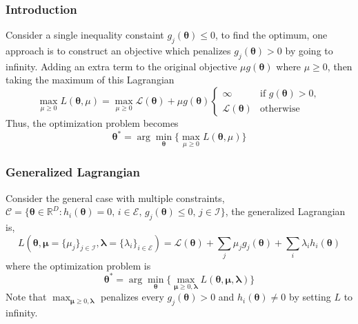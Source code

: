 \documentclass[11pt]{article}
\begin{document}
\subsubsection*{Introduction}
Consider a single inequality constaint $g_j(\boldsymbol{\theta}) \leq 0$, to find the optimum, one approach is to construct an objective which penalizes $g_j(\boldsymbol{\theta}) > 0$ by going to infinity.
Adding an extra term to the original objective $\mu g(\boldsymbol{\theta})$ where $\mu \geq 0$, then taking the maximum of this Lagrangian
\[
\max_{\mu \geq 0} L(\boldsymbol{\theta}, \mu) = \max_{\mu \geq 0} \mathcal{L}(\boldsymbol{\theta}) + \mu g(\boldsymbol{\theta})
\begin{cases}
\infty & \text{if } g(\boldsymbol{\theta}) > 0, \\
\mathcal{L}(\boldsymbol{\theta}) & \text{otherwise}
\end{cases}
\]
Thus, the optimization problem becomes
\[
\boldsymbol{\theta}^* = \arg \min_{\boldsymbol{\theta}} \biggl\{\max_{\mu \geq 0} L(\boldsymbol{\theta}, \mu) \biggr\} 
\]

\subsubsection*{Generalized Lagrangian}
Consider the general case with multiple constraints, $\mathcal{C} = \{\boldsymbol{\theta} \in \mathbb{R}^D : h_i(\boldsymbol{\theta}) = 0,\, i \in \mathcal{E},\, g_j(\boldsymbol{\theta}) \leq 0,\, j \in \mathcal{I}\}$,
the generalized Lagrangian is,
\[
L(\boldsymbol{\theta}, \boldsymbol{\mu} = \{ \mu_j \}_{j \in \mathcal{I}}, \boldsymbol{\lambda} = \{ \lambda_i \}_{i \in \mathcal{E}}) = \mathcal{L}(\boldsymbol{\theta}) + \sum_j \mu_j g_j(\boldsymbol{\theta}) + \sum_i \lambda_i h_i(\boldsymbol{\theta})
\]
where the optimization problem is
\[
\boldsymbol{\theta}^* = \arg \min_{\boldsymbol{\theta}} \biggl\{ \max_{\boldsymbol{\mu} \geq 0, \boldsymbol{\lambda}} L(\boldsymbol{\theta}, \boldsymbol{\mu}, \boldsymbol{\lambda}) \biggr\} 
\]
Note that $\max_{\boldsymbol{\mu} \geq 0, \boldsymbol{\lambda}}$ penalizes every $g_j(\boldsymbol{\theta}) > 0$ and $h_i(\boldsymbol{\theta}) \neq 0$ by setting $L$ to infinity.
\end{document}
